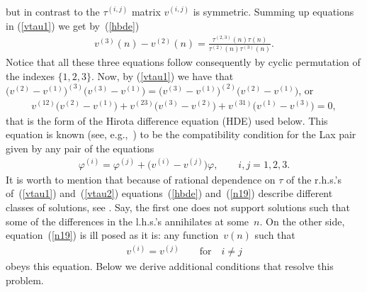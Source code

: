 \documentclass[pdftex]{sigma}
\numberwithin{equation}{section}
\begin{document}
but in contrast to the $\tau^{(i,j)}$ matrix $v^{(i,j)}$ is symmetric. Summing up equations in (\ref{vtau1}) we get by~(\ref{hbde})
 \begin{gather}
v^{(3)}(n)-v^{(2)}(n)=\frac{\tau^{(2,3)}(n)\tau(n)}{\tau^{(2)}(n)\tau^{(3)}(n)}.\label{vtau2}
\end{gather}
Notice that all these three equations follow consequently by cyclic permutation of the indexes $\{1,2,3\}$. Now, by (\ref{vtau1}) we have that $\big(v^{(2)}-v^{(1)}\big)^{(3)}\big(v^{(3)}-v^{(1)}\big)=\big(v^{(3)}-v^{(1)}\big)^{(2)}\big(v^{(2)}-v^{(1)}\big)$, or
\begin{gather}
v^{(12)}\big(v^{(2)}-v^{(1)}\big)+v^{(23)}\big(v^{(3)}-v^{(2)}\big)+v^{(31)}\big(v^{(1)}-v^{(3)}\big)=0,\label{n19}
\end{gather}
that is the form of the Hirota dif\/ference equation (HDE) used below. This equation is known (see, e.g.,~\cite{Zabrodin1997}) to be the compatibility condition for the Lax pair given by any pair of the equations
\begin{gather}
\varphi^{(i)}=\varphi^{(j)}+\big(v^{(i)}-v^{(j)}\big)\varphi,\qquad i,j=1,2,3.\label{59'}
\end{gather}
It is worth to mention that because of rational dependence on $\tau$ of the r.h.s.'s of~(\ref{vtau1}) and~(\ref{vtau2}) equations~(\ref{hbde}) and~(\ref{n19}) describe dif\/ferent classes of solutions, see \cite{Pogrebkov2011}. Say, the f\/irst one does not support solutions such that some of the dif\/ferences in the l.h.s.'s annihilates at some~$n$. On the other side, equation~(\ref{n19}) is ill posed as it is: any function~$v(n)$ such that
\begin{gather}
v^{(i)}=v^{(j)} \qquad \text{for}\quad  i\neq{j} \label{ill}
\end{gather}
obeys this equation. Below we derive additional conditions that resolve this problem.
\end{document}
